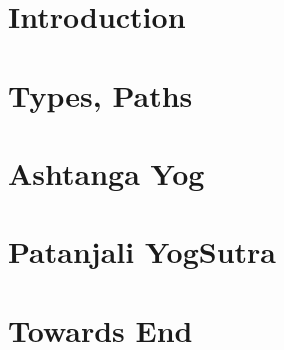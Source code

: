 \section[Intro]{Introduction}


\section[Types]{Types, Paths}


\section[Ashtanga]{Ashtanga Yog}











\section[Patanjali]{Patanjali YogSutra}






\section[End]{Towards End}
